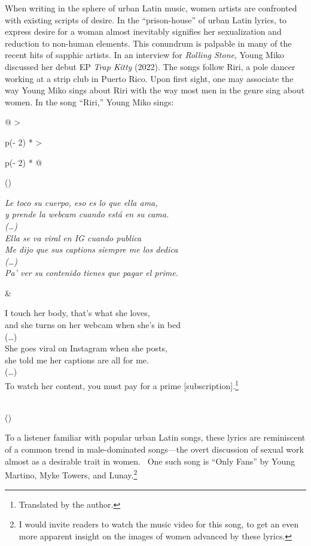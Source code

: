\documentclass[
  letterpaper,
  DIV=11,
  numbers=noendperiod]{scrartcl}
\begin{document}
When writing in the sphere of urban Latin music, women artists are
confronted with existing scripts of desire. In the ``prison-house'' of
urban Latin lyrics, to express desire for a woman almost inevitably
signifies her sexualization and reduction to non-human elements. This
conundrum is palpable in many of the recent hits of sapphic artists. In
an interview for \emph{Rolling Stone}, Young Miko discussed her debut EP
\emph{Trap Kitty} (2022). The songs follow Riri, a pole dancer working
at a strip club in Puerto Rico. Upon first sight, one may associate the
way Young Miko sings about Riri with the way most men in the genre sing
about women. In the song ``Riri,'' Young Miko sings:

\begin{longtable}[]{@{}
  >{\raggedright\arraybackslash}p{(\columnwidth - 2\tabcolsep) * }
  >{\raggedright\arraybackslash}p{(\columnwidth - 2\tabcolsep) * }@{}}
\toprule()
\endhead
\begin{minipage}[t]{\linewidth}\raggedright
\emph{Le toco su cuerpo, eso es lo que ella ama,}\\
\emph{y prende la webcam cuando está en su cama.}\\
\emph{(\ldots)}\\
\emph{Ella se va viral en IG cuando publica}\\
\emph{Me dijo que sus captions siempre me los dedica}\\
\emph{(\ldots)}\\
\emph{Pa' ver su contenido tienes que pagar el prime.}\strut
\end{minipage} & \begin{minipage}[t]{\linewidth}\raggedright
I touch her body, that's what she loves,\\
and she turns on her webcam when she's in bed\\
(\ldots)\\
She goes viral on Instagram when she posts,\\
she told me her captions are all for me.\\
(\ldots)\\
To watch her content, you must pay for a prime
{[}subscription{]}.\footnote{Translated by the author.}\strut
\end{minipage} \\
\bottomrule()
\end{longtable}

To a listener familiar with popular urban Latin songs, these lyrics are
reminiscent of a common trend in male-dominated songs---the overt
discussion of sexual work almost as a desirable trait in women. ~One
such song is ``Only Fans'' by Young Martino, Myke Towers, and
Lunay.\footnote{I would invite readers to watch the music video for this
  song, to get an even more apparent insight on the images of women
  advanced by these lyrics.}
\end{document}
